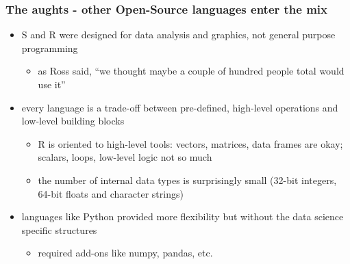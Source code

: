 \documentclass[pdf]{beamer}
\begin{document}
  \begin{frame}\frametitle{The aughts - other Open-Source languages enter the mix}
    \begin{itemize}
      \pause
      \item S and R were designed for data analysis and graphics, not general purpose programming
      \begin{itemize}
        \pause
        \item
        as Ross said, ``we thought maybe a couple of hundred people total  would use it''
      \end{itemize}
      \pause
      \item every language is a trade-off between pre-defined, high-level operations and low-level building blocks
      \begin{itemize}
        \pause
        \item
        R is oriented to high-level tools: vectors, matrices, data frames are okay; scalars, loops, low-level logic not so much
        \item
        the number of internal data types is surprisingly small (32-bit integers, 64-bit floats and character strings)
      \end{itemize}
      \pause
      \item
      languages like Python provided more flexibility but without the data
      science specific structures
      \begin{itemize}
        \pause
        \item required add-ons like numpy, pandas, etc.
      \end{itemize}
    \end{itemize}
  \end{frame}
\end{document}
